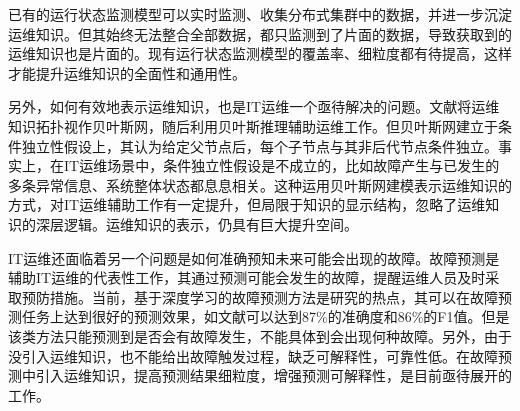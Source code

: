 已有的运行状态监测模型\cite{wang2019grano,nie2016mining-causality-graph,qiu2020causality-mining-knowledge-graph}可以实时监测、收集分布式集群中的数据，并进一步沉淀运维知识。但其始终无法整合全部数据，都只监测到了片面的数据，导致获取到的运维知识也是片面的。现有运行状态监测模型的覆盖率、细粒度都有待提高，这样才能提升运维知识的全面性和通用性。

另外，如何有效地表示运维知识，也是IT运维一个亟待解决的问题。文献\parencite{nie2016mining-causality-graph,qiu2020causality-mining-knowledge-graph,tan2012prepare}将运维知识拓扑视作贝叶斯网，随后利用贝叶斯推理辅助运维工作。但贝叶斯网建立于条件独立性假设上，其认为给定父节点后，每个子节点与其非后代节点条件独立。事实上，在IT运维场景中，条件独立性假设是不成立的，比如故障产生与已发生的多条异常信息、系统整体状态都息息相关。这种运用贝叶斯网建模表示运维知识的方式，对IT运维辅助工作有一定提升，但局限于知识的显示结构，忽略了运维知识的深层逻辑。运维知识的表示，仍具有巨大提升空间。

IT运维还面临着另一个问题是如何准确预知未来可能会出现的故障。故障预测是辅助IT运维的代表性工作，其通过预测可能会发生的故障，提醒运维人员及时采取预防措施。当前，基于深度学习的故障预测方法\cite{xu2016health,cheng2018machine,du2017deeplog,das2018desh,islam2017predicting,li2020predicting,gao2020task}是研究的热点，其可以在故障预测任务上达到很好的预测效果，如文献\parencite{gao2020task}可以达到87\%的准确度和86\%的F1值。但是该类方法只能预测到是否会有故障发生，不能具体到会出现何种故障。另外，由于没引入运维知识，也不能给出故障触发过程，缺乏可解释性，可靠性低。在故障预测中引入运维知识，提高预测结果细粒度，增强预测可解释性，是目前亟待展开的工作。

